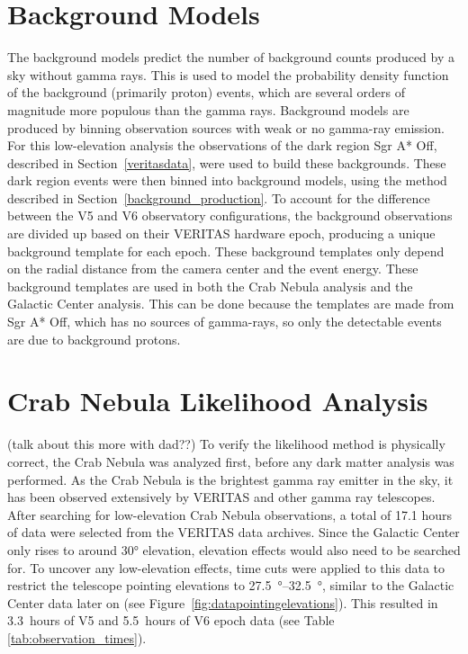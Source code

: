 \section{Background Models}\label{sec:bkgmodels}
  The background models predict the number of background counts produced by a sky without gamma rays.
  This is used to model the probability density function of the background (primarily proton) events, which are several orders of magnitude more populous than the gamma rays.
  Background models are produced by binning observation sources with weak or no gamma-ray emission.
  For this low-elevation analysis the observations of the dark region Sgr A* Off, described in Section~\ref{veritasdata}, were used to build these backgrounds.
  These dark region events were then binned into background models, using the method described in Section~\ref{background_production}.
  To account for the difference between the V5 and V6 observatory configurations, the background observations are divided up based on their VERITAS hardware epoch, producing a unique background template for each epoch.
  These background templates only depend on the radial distance from the camera center and the event energy.
  These background templates are used in both the Crab Nebula analysis and the Galactic Center analysis.
  This can be done because the templates are made from Sgr A* Off, which has no sources of gamma-rays, so only the detectable events are due to background protons.

\section{Crab Nebula Likelihood Analysis}\label{sec:crab_analysis}
  {\color{red}(talk about this more with dad??)}
  To verify the likelihood method is physically correct, the Crab Nebula was analyzed first, before any dark matter analysis was performed.
  As the Crab Nebula is the brightest gamma ray emitter in the sky, it has been observed extensively by VERITAS and other gamma ray telescopes.
  After searching for low-elevation Crab Nebula observations, a total of 17.1 hours of data were selected from the VERITAS data archives.
  Since the Galactic Center only rises to around \ang{30} elevation, elevation effects would also need to be searched for.
  To uncover any low-elevation effects, time cuts were applied to this data to restrict the telescope pointing elevations to \SIrange{27.5}{32.5}{\degree}, similar to the Galactic Center data later on (see Figure~\ref{fig:datapointingelevations}).
  This resulted in \SI{3.3}{hours} of V5 and \SI{5.5}{hours} of V6 epoch data (see Table \ref{tab:observation_times}).
    
